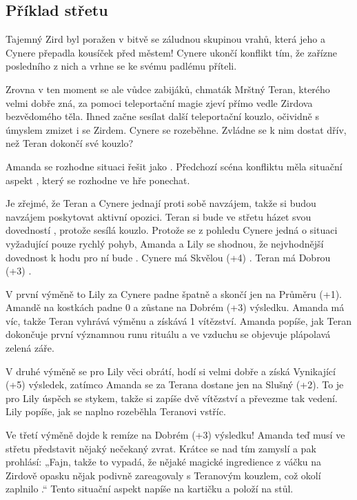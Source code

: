 \documentclass[../main.tex]{subfiles}
\begin{document}
\subsection{Příklad střetu}
\label{sec:příklad-střet}

Tajemný Zird byl poražen v bitvě se záludnou skupinou vrahů, která jeho a Cynere přepadla
kousíček před městem! Cynere ukončí konflikt tím, že zařízne posledního z nich a vrhne se
ke svému padlému příteli.

Zrovna v ten moment se ale vůdce zabijáků, chmaták Mrštný Teran, kterého velmi dobře zná,
za pomoci teleportační magie zjeví přímo vedle Zirdova bezvědomého těla. Ihned začne
sesílat další teleportační kouzlo, očividně s úmyslem zmizet i se Zirdem. Cynere se
rozeběhne. Zvládne se k nim dostat dřív, než Teran dokončí své kouzlo?

Amanda se rozhodne situaci řešit jako . Předchozí scéna konfliktu měla
situační aspekt , který se rozhodne ve hře ponechat.

Je zřejmé, že Teran a Cynere jednají proti sobě navzájem, takže si budou navzájem
poskytovat aktivní opozici. Teran si bude ve střetu házet svou dovedností ,
protože sesílá kouzlo. Protože se z pohledu Cynere jedná o situaci vyžadující pouze
rychlý pohyb, Amanda a Lily se shodnou, že nejvhodnější dovednost k hodu pro ní bude .
Cynere má Skvělou (+4) . Teran má Dobrou (+3) .

V první výměně to Lily za Cynere padne špatně a skončí jen na Průměru (+1). Amandě na
kostkách padne 0 a zůstane na Dobrém (+3) výsledku. Amanda má víc, takže Teran vyhrává
výměnu a získává 1 vítězství. Amanda popíše, jak Teran dokončuje první významnou runu
rituálu a ve vzduchu se objevuje plápolavá zelená záře.

V druhé výměně se pro Lily věci obrátí, hodí si velmi dobře a získá Vynikající (+5)
výsledek, zatímco Amanda se za Terana dostane jen na Slušný (+2). To je pro Lily úspěch
se stykem, takže si zapíše dvě vítězství a převezme tak vedení. Lily popíše, jak se
naplno rozeběhla Teranovi vstříc.

Ve třetí výměně dojde k remíze na Dobrém (+3) výsledku! Amanda teď musí ve střetu
představit nějaký nečekaný zvrat. Krátce se nad tím zamyslí a pak prohlásí: „Fajn, takže
to vypadá, že nějaké magické ingredience z váčku na Zirdově opasku nějak podivně
zareagovaly s Teranovým kouzlem, což okolí zaplnilo .“ Tento
situační aspekt napíše na kartičku a položí na stůl.
\end{document}
